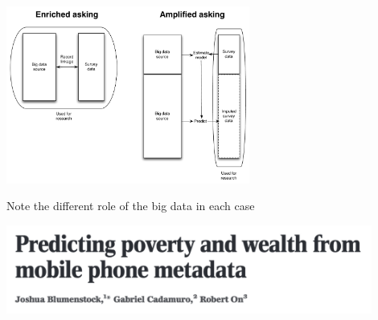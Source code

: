\documentclass[aspectratio=169]{beamer}
\begin{document}
\begin{frame}

\begin{center}
\includegraphics[width=0.6\textwidth]{figures/bitbybit3-12_found_survey_combined}
\end{center}

Note the different role of the big data in each case

\end{frame}
\begin{frame}

\begin{center}
\includegraphics[width=0.9\textwidth]{figures/blumenstock_predicting_2015_title}
\end{center}

\end{frame}
\end{document}
